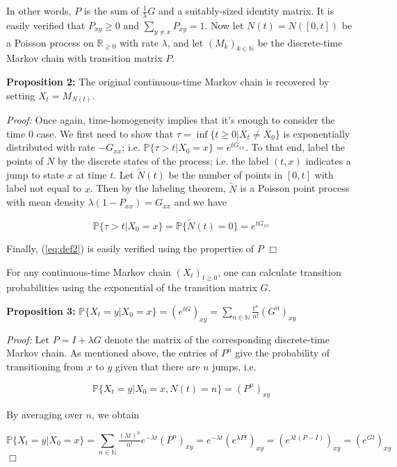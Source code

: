 \documentclass[10pt]{article}
\newcommand{\R}{\mathbb{R}}
\newcommand{\N}{\mathbb{N}}
\newcommand{\Prob}{\mathbb{P}}
\begin{document}
In other words, $P$ is the sum of $\tfrac{1}{\lambda} G$ and a suitably-sized identity matrix. It is easily verified that $P_{xy} \geq 0$ and $\sum_{y \neq x} P_{xy}=1$. Now let $N(t)=N([0,t])$ be a Poisson process on $\R_{\geq 0}$ with rate $\lambda$, and let $(M_k)_{k \in \N}$ be the discrete-time Markov chain with transition matrix $P$.

\noindent \textbf{Proposition 2:} The original continuous-time Markov chain is recovered by setting $X_t=M_{N(t)}$.

\textit{Proof:} Once again, time-homogeneity implies that it's enough to consider the time 0 case. We first need to show that $\tau=\inf\{t \geq 0 | X_t \neq X_0 \}$ is exponentially distributed with rate $-G_{xx}$; i.e. $\Prob \{\tau >t | X_0=x\}=e^{tG_{xx}}$. To that end, label the points of $N$ by the discrete states of the process; i.e. the label $(t,x)$ indicates a jump to state $x$ at time $t$. Let $\tilde{N}(t)$ be the number of points in $[0,t]$ with label not equal to $x$. Then by the labeling theorem, $\tilde{N}$ is a Poisson point process with mean density $\lambda(1-P_{xx})=G_{xx}$ and we have

$$\Prob \{\tau >t | X_0=x\}=\Prob \{\tilde{N}(t)=0\}=e^{t G_{xx}}$$

Finally, (\ref{eq:def2}) is easily verified using the properties of $P$
\hfill
$\Box$

For any continuous-time Markov chain $(X_t)_{t \geq 0}$, one can calculate transition probabilities using the exponential of the transition matrix $G$.

\noindent \textbf{Proposition 3:} $\Prob \{X_t=y | X_0=x\}=\left(e^{tG} \right)_{xy}=\sum_{n \in \N} \tfrac{t^n}{n!} (G^n)_{xy}$

\textit{Proof:} Let $P=I+\lambda G$ denote the matrix of the corresponding discrete-time Markov chain. As mentioned above, the entries of $P^n$ give the probability of transitioning from $x$ to $y$ given that there are $n$ jumps, i.e.

$$\Prob \{X_t=y | X_0=x, N(t)=n\}=(P^n)_{xy}$$

By averaging over $n$, we obtain

$$\Prob\{X_t=y | X_0=x\}=\sum_{n \in \N} \tfrac{(\lambda t)^n}{n!} e^{-\lambda t} (P^n)_{xy}=e^{-\lambda t} \left(e^{\lambda Pt} \right)_{xy}=\left(e^{\lambda t(P-I)} \right)_{xy}=\left(e^{Gt} \right)_{xy}$$
\hfill
$\Box$
\end{document}
